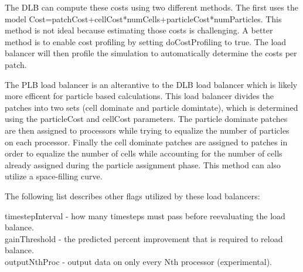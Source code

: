 The DLB can compute these costs using two different methods.  The first uses
the model Cost=patchCost+cellCost*numCells+particleCost*numParticles.  This
method is not ideal because estimating those costs is challenging.  A better
method is to enable cost profiling by setting doCostProfiling to true.  The 
load balancer will then profile the simulation to automatically determine the
costs per patch.

The PLB load balancer is an alterantive to the DLB load balancer which is
likely more efficent for particle based calculations.  This load balancer
divides the patches into two sets (cell dominate and particle domintate), 
which is determined using the particleCost and cellCost parameters.
The particle dominate patches are then assigned to processors while trying
to equalize the number of particles on each processor.  Finally the 
cell dominate patches are assigned to patches in order to equalize the number
of cells while accounting for the number of cells already assigned during 
the particle assignment phase.  This method can also utilize a space-filling
curve.  

The following list describes other flags utilized by these load balancers:
\begin{itemize}
  timestepInterval - how many timesteps must pass before reevaluating the load balance.  \\
  gainThreshold - the predicted percent improvement that is required to reload balance.  \\
  outputNthProc - output data on only every Nth processor (experimental). \\

\end{itemize}


